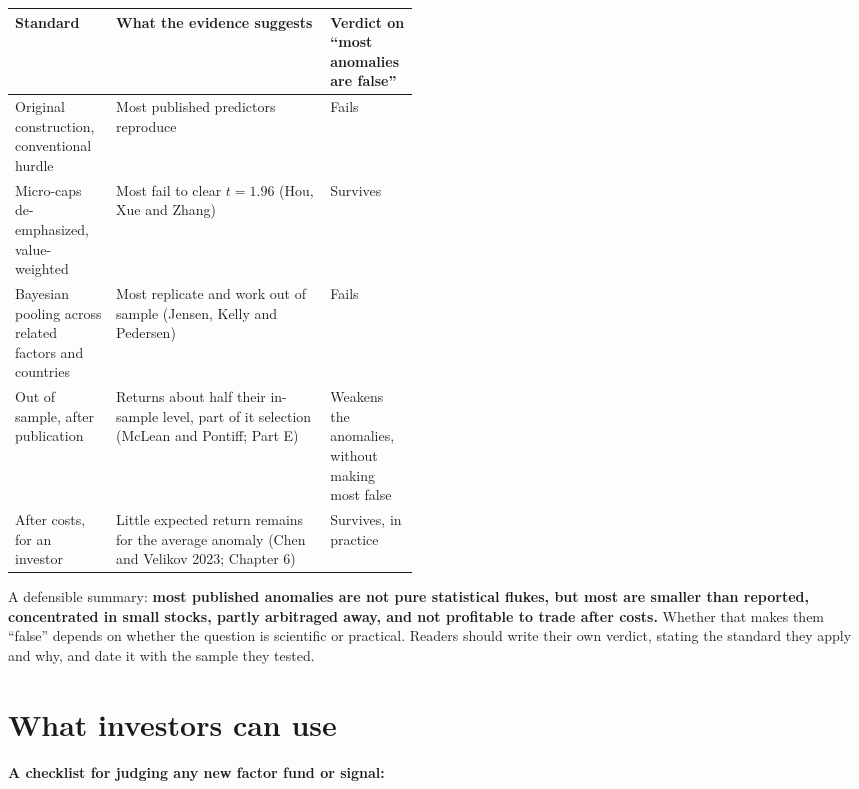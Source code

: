 \begin{center}
\small
\begin{tabularx}{0.9\linewidth}{@{}>{\raggedright\arraybackslash}p{0.25\linewidth}>{\raggedright\arraybackslash}X>{\raggedright\arraybackslash}p{0.22\linewidth}@{}}
\toprule
Standard & What the evidence suggests & Verdict on ``most anomalies are false'' \\
\midrule
Original construction, conventional hurdle & Most published predictors reproduce & Fails \\
Micro-caps de-emphasized, value-weighted & Most fail to clear $t = 1.96$ (Hou, Xue and Zhang) & Survives \\
Bayesian pooling across related factors and countries & Most replicate and work out of sample (Jensen, Kelly and Pedersen) & Fails \\
Out of sample, after publication & Returns about half their in-sample level, part of it selection (McLean and Pontiff; Part E) & Weakens the anomalies, without making most false \\
After costs, for an investor & Little expected return remains for the average anomaly (Chen and Velikov 2023; Chapter 6) & Survives, in practice \\
\bottomrule
\end{tabularx}
\end{center}

A defensible summary: \textbf{most published anomalies are not pure statistical flukes, but most are smaller than reported, concentrated in small stocks, partly arbitraged away, and not profitable to trade after costs.} Whether that makes them ``false'' depends on whether the question is scientific or practical. Readers should write their own verdict, stating the standard they apply and why, and date it with the sample they tested.

\section{What investors can use}
\label{sec:10-investors}

\textbf{A checklist for judging any new factor fund or signal:}

